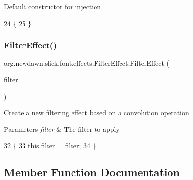 Default constructor for injection 
\begin{DoxyCode}
24                            \{
25     \}
\end{DoxyCode}
\mbox{\label{classorg_1_1newdawn_1_1slick_1_1font_1_1effects_1_1_filter_effect_a82a33ff77dd0c26d5418a7ce8a7c5791}} 
\subsubsection{\texorpdfstring{Filter\+Effect()}{FilterEffect()}\hspace{0.1cm}{\footnotesize\ttfamily [2/2]}}
{\footnotesize\ttfamily org.\+newdawn.\+slick.\+font.\+effects.\+Filter\+Effect.\+Filter\+Effect (\begin{DoxyParamCaption}\item[{Buffered\+Image\+Op}]{filter }\end{DoxyParamCaption})\hspace{0.3cm}{\ttfamily [inline]}}

Create a new filtering effect based on a convolution operation


\begin{DoxyParams}{Parameters}
{\em filter} & The filter to apply \\
\hline
\end{DoxyParams}

\begin{DoxyCode}
32                                                  \{
33         this.\mbox{\hyperlink{classorg_1_1newdawn_1_1slick_1_1font_1_1effects_1_1_filter_effect_aafe0a98e55b983f1b26e5ed235d254be}{filter}} = \mbox{\hyperlink{classorg_1_1newdawn_1_1slick_1_1font_1_1effects_1_1_filter_effect_aafe0a98e55b983f1b26e5ed235d254be}{filter}};
34     \}
\end{DoxyCode}


\subsection{Member Function Documentation}
\mbox{\label{classorg_1_1newdawn_1_1slick_1_1font_1_1effects_1_1_filter_effect_a9c479e0b3f3217e26097c74d5db33f45}} 
